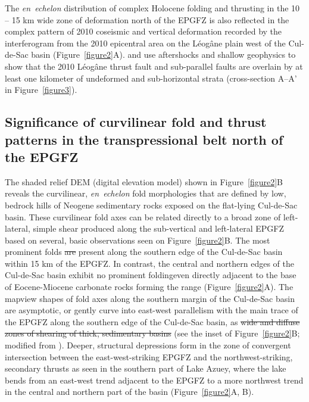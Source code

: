 \documentclass[linenumbers,draft]{agujournal}
\providecommand{\DIFaddtex}[1]{{\protect\color{blue}\uwave{#1}}} %
\providecommand{\DIFdeltex}[1]{{\protect\color{red}\sout{#1}}}                      %
\providecommand{\DIFaddbegin}{} %
\providecommand{\DIFaddend}{} %
\providecommand{\DIFdelbegin}{} %
\providecommand{\DIFdelend}{} %
\providecommand{\DIFadd}[1]{\texorpdfstring{\DIFaddtex{#1}}{#1}} %
\providecommand{\DIFdel}[1]{\texorpdfstring{\DIFdeltex{#1}}{}} %
\begin{document}
The \textit{en~echelon} distribution of complex Holocene folding and thrusting in the 10 -- 15 km wide zone of deformation north of the EPGFZ is also reflected in the complex pattern of 2010 coseismic and vertical deformation recorded by the interferogram from the 2010 epicentral area on the L\'eog\^ane plain west of the Cul-de-Sac basin \citep{hayes2010complex,hashimoto2011fan,bilham2013remote} (Figure~\ref{figure2}A). \citet{douilly2013crustal,douilly2015three} and \citet{kocel2016near} use aftershocks and shallow geophysics to show that the 2010 L\'eog\^ane thrust fault and sub-parallel faults are overlain by at least one kilometer of undeformed and sub-horizontal strata (cross-section A--A' in Figure~\ref{figure3}).

\subsection{Significance of curvilinear fold and thrust patterns in the transpressional belt north of the EPGFZ}
The shaded relief DEM (digital elevation model) shown in Figure~\ref{figure2}B reveals the curvilinear, \textit{en~echelon} fold morphologies that are defined by low, bedrock hills of Neogene sedimentary rocks exposed on the flat-lying Cul-de-Sac basin. These curvilinear fold axes can be related directly to a broad zone of left-lateral, simple shear produced along the sub-vertical and left-lateral EPGFZ based on several, basic observations seen on Figure~\ref{figure2}B. The most prominent folds \DIFdelbegin \DIFdel{are }\DIFdelend present along the southern edge of the Cul-de-Sac basin \DIFaddbegin \DIFadd{are }\DIFaddend within 15 km of the EPGFZ. In contrast, the central and northern edges of the Cul-de-Sac basin exhibit no prominent folding\DIFaddbegin \DIFadd{, }\DIFaddend even directly adjacent to the base of Eocene-Miocene carbonate rocks forming the range \citep{pubellier2000plate} (Figure~\ref{figure2}A). The mapview shapes of fold axes along the southern margin of the Cul-de-Sac basin are asymptotic, or gently curve into east-west parallelism with the main trace of the EPGFZ along the southern edge of the Cul-de-Sac basin, as \DIFdelbegin \DIFdel{wide and diffuse zones of shearing of thick, sedimentary basins }\DIFdelend \DIFaddbegin \DIFadd{observed in claybox experiments of shearing }\DIFaddend (see the inset of Figure~{\ref{figure2}}B; modified from \citet{odonne1983analogue}). Deeper, structural depressions form in the zone of convergent intersection between the east-west-striking EPGFZ and the northwest-striking, secondary thrusts as seen in the southern part of Lake Azuey, where the lake bends from an east-west trend adjacent to the EPGFZ to a more northwest trend in the central and northern part of the basin (Figure~\ref{figure2}A, B).
\end{document}
